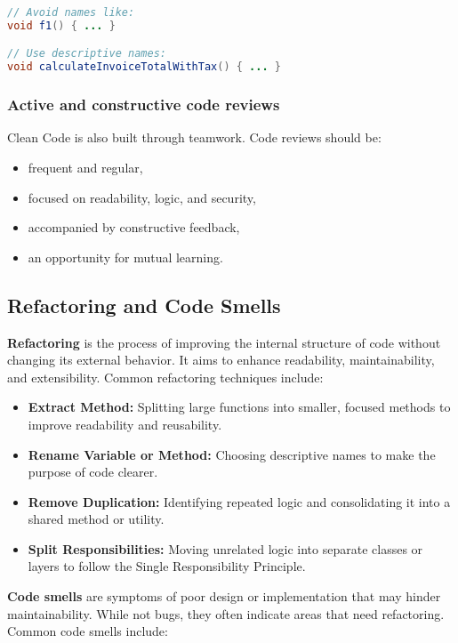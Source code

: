 \documentclass[a4paper,12pt]{article}
\begin{document}
\begin{lstlisting}[language=Java]
// Avoid names like:
void f1() { ... }

// Use descriptive names:
void calculateInvoiceTotalWithTax() { ... }
\end{lstlisting}

\subsubsection{Active and constructive code reviews}
Clean Code is also built through teamwork. Code reviews should be:
\begin{itemize}
  \item frequent and regular,
  \item focused on readability, logic, and security,
  \item accompanied by constructive feedback,
  \item an opportunity for mutual learning.
\end{itemize}

\subsection{Refactoring and Code Smells}

\textbf{Refactoring} is the process of improving the internal structure of code without changing its external behavior. It aims to enhance readability, maintainability, and extensibility. Common refactoring techniques include:

\begin{itemize}
  \item \textbf{Extract Method:} Splitting large functions into smaller, focused methods to improve readability and reusability.
  \item \textbf{Rename Variable or Method:} Choosing descriptive names to make the purpose of code clearer.
  \item \textbf{Remove Duplication:} Identifying repeated logic and consolidating it into a shared method or utility.
  \item \textbf{Split Responsibilities:} Moving unrelated logic into separate classes or layers to follow the Single Responsibility Principle.
\end{itemize}

\textbf{Code smells} are symptoms of poor design or implementation that may hinder maintainability. While not bugs, they often indicate areas that need refactoring. Common code smells include:
\end{document}
